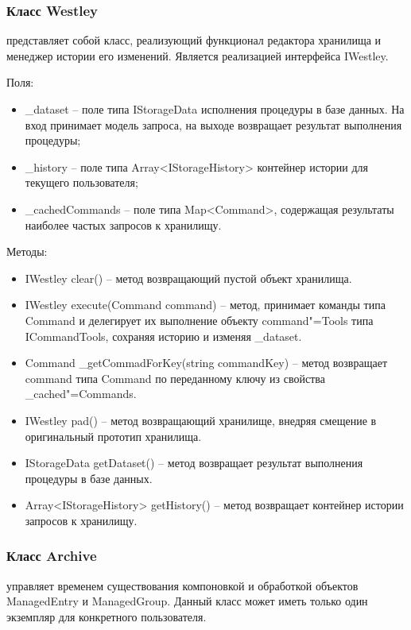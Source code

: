 \subsubsection{Класс Westley }
\label{sub:arch_and_mod:probab_net:westley}

представляет собой класс, реализующий функционал редактора хранилища и менеджер истории его изменений. Является реализацией интерфейса IWestley.

Поля:
\begin{itemize}
  \item \_dataset – поле типа IStorageData исполнения процедуры в базе данных. На вход принимает модель запроса, на выходе возвращает результат выполнения процедуры;
  \item \_history – поле типа Array<IStorageHistory> контейнер истории для текущего пользователя;
  \item \_cachedCommands – поле типа Map<Command>, содержащая результаты наиболее частых запросов к хранилищу.
\end{itemize}

Методы:
\begin{itemize}
  \item IWestley clear() – метод возвращающий пустой объект хранилища.
  \item IWestley execute(Command command) – метод, принимает команды типа Command и делегирует их выполнение объекту command"=Tools типа ICommandTools, сохраняя историю и изменяя \_dataset.
  \item Command \_getCommadForKey(string commandKey) – метод возвращает command типа Command по переданному ключу из свойства \_cached"=Commands.
  \item IWestley pad() – метод возвращающий хранилище, внедряя смещение в оригинальный прототип хранилища.
  \item IStorageData getDataset() – метод возвращает результат выполнения процедуры в базе данных.
  \item Array<IStorageHistory> getHistory() – метод возвращает контейнер истории запросов к хранилищу.
\end{itemize}

\subsubsection{Класс Archive }
\label{sub:arch_and_mod:probab_net:archive}

управляет временем существования компоновкой и обработкой объектов ManagedEntry и ManagedGroup. Данный класс может иметь только один экземпляр для конкретного пользователя.

